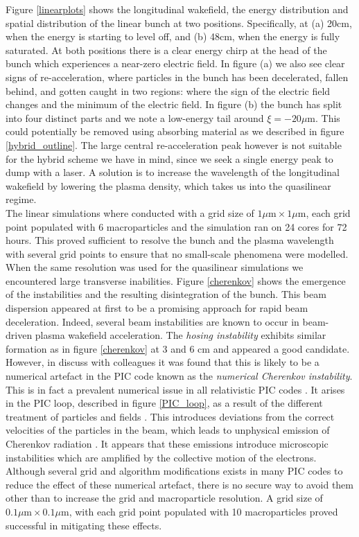 \indent Figure \ref{linearplots} shows the longitudinal wakefield, the energy distribution and spatial distribution of the linear bunch at two positions. Specifically, at (a) 20cm, when the energy is starting to level off, and (b) 48cm, when the energy is fully saturated. At both positions there is a clear energy chirp at the head of the bunch which experiences a near-zero electric field. In figure (a) we also see clear signs of re-acceleration, where particles in the bunch has been decelerated, fallen behind, and gotten caught in two regions: where the sign of the electric field changes and the minimum of the electric field. In figure (b) the bunch has split into four distinct parts and we note a low-energy tail around $\xi=-20 \mu\text{m}$. This could potentially be removed using absorbing material as we described in figure \ref{hybrid_outline}. The large central re-acceleration peak however is not suitable for the hybrid scheme we have in mind, since we seek a single energy peak to dump with a laser. A solution is  to increase the wavelength of the longitudinal wakefield by lowering the plasma density, which takes us into the quasilinear regime. \\
\indent The linear simulations where conducted with a grid size of $1 \mu\text{m}\times 1\mu\text{m}$, each grid point populated with 6 macroparticles and the simulation ran on 24 cores for 72 hours. This proved sufficient to resolve the bunch and the plasma wavelength with several grid points to ensure that no small-scale phenomena were modelled.  When the same resolution was used for the quasilinear simulations we encountered large transverse inabilities. Figure \ref{cherenkov} shows the emergence of the instabilities and the resulting disintegration of the bunch. This beam dispersion appeared at first to be a promising approach for rapid beam deceleration. Indeed, several beam instabilities are known to occur in beam-driven plasma wakefield acceleration. The \textit{hosing instability} \cite{Huang2007} exhibits similar formation as in figure \ref{cherenkov} at 3 and 6 cm and appeared a good candidate. However, in discuss with colleagues it was found that this is likely to be a numerical artefact in the PIC code known as the \textit{numerical Cherenkov instability}. This is in fact a prevalent numerical issue in all relativistic PIC codes \cite{Godfrey2018}. It arises in the PIC loop, described in figure \ref{PIC_loop}, as a result of the different treatment of particles and fields  \cite{Blinne}. This introduces deviations from the correct velocities of the particles in the beam, which  leads to unphysical emission of Cherenkov radiation \cite{Godfrey2018}. It appears that these emissions introduce microscopic instabilities which are amplified by the collective motion of the electrons. Although several grid and algorithm modifications exists in many PIC codes to reduce the effect of these numerical artefact, there is no secure way to avoid them other than to increase the grid and macroparticle resolution. A grid size of $0.1 \mu\text{m}\times 0.1\mu\text{m}$, with each grid point populated with 10 macroparticles proved successful in mitigating these effects. 
